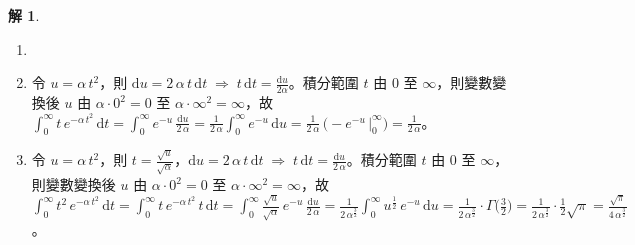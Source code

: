 \documentclass[12pt]{extarticle}
\newcommand{\ds}{\displaystyle}
\newcommand{\ie}{\;\Longrightarrow\;}
\theoremstyle{definition}
\newtheorem*{sol}{解}
\begin{document}
\begin{sol}
  \begin{enumerate}\setlength\itemsep{0em}
    \item[]
    \item 令 $\ds u = \alpha\,t^2$，則 $\ds\mathrm{d}u = 2\,\alpha\,t\,\mathrm{d}t \ie t\,\mathrm{d}t = \frac{\mathrm{d}u}{2\alpha}$。積分範圍 $t$ 由 $0$ 至 $\infty$，則變數變換後 $u$ 由 $\ds\alpha\cdot0^2 = 0$ 至 $\ds\alpha\cdot\infty^2 = \infty$，故 $\ds\int_0^\infty t\,e^{-\alpha\,t^2}\,\mathrm{d}t = \int_0^\infty e^{-u}\,\frac{\mathrm{d}u}{2\,\alpha} = \frac{1}{2\,\alpha}\int_0^\infty e^{-u}\,\mathrm{d}u = \frac{1}{2\,\alpha}\,\Big(-e^{-u}\,\Big|_0^\infty\Big) = \frac{1}{2\,\alpha}$。
    \item 令 $\ds u = \alpha\,t^2$，則 $\ds t = \frac{\sqrt{u}}{\sqrt{\alpha}}$，$\ds\mathrm{d}u = 2\,\alpha\,t\,\mathrm{d}t \ie t\,\mathrm{d}t = \frac{\mathrm{d}u}{2\,\alpha}$。積分範圍 $t$ 由 $0$ 至 $\infty$，則變數變換後 $u$ 由 $\ds\alpha\cdot0^2 = 0$ 至 $\ds\alpha\cdot\infty^2 = \infty$，故 $\ds\int_0^\infty t^2\,e^{-\alpha\,t^2}\,\mathrm{d}t = \int_0^\infty t\,e^{-\alpha\,t^2}\,t\,\mathrm{d}t = \int_0^\infty\frac{\sqrt{u}}{\sqrt{\alpha}}\,e^{-u}\,\frac{\mathrm{d}u}{2\,\alpha} = \frac{1}{2\,\alpha^{\frac{3}{2}}}\int_0^\infty u^{\frac{1}{2}}\,e^{-u}\,\mathrm{d}u = \frac{1}{2\,\alpha^{\frac{3}{2}}}\cdot\Gamma\Big(\frac{3}{2}\Big) = \frac{1}{2\,\alpha^{\frac{3}{2}}}\cdot\frac{1}{2}\sqrt{\pi} = \frac{\sqrt{\pi}}{4\,\alpha^{\frac{3}{2}}}$。
  \end{enumerate}
\end{sol}
\end{document}
